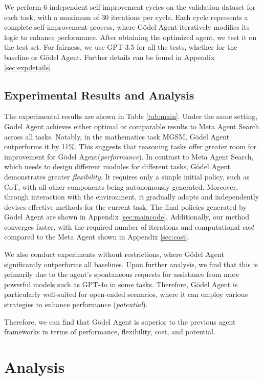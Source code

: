 \documentclass[11pt]{article}
\newcommand{\framework}{Gödel Agent\xspace}
\begin{document}
We perform 6 independent self-improvement cycles on the validation dataset for each task, with a maximum of 30 iterations per cycle. Each cycle represents a complete self-improvement process, where \framework iteratively modifies its logic to enhance performance.
After obtaining the optimized agent, we test it on the test set. For fairness, we use GPT-3.5 for all the tests, whether for the baseline or \framework{}.
Further details can be found in Appendix \ref{sec:expdetails}.



\subsection{Experimental Results and Analysis}
The experimental results are shown in Table \ref{tab:main}. Under the same setting, \framework achieves either optimal or comparable results to Meta Agent Search across all tasks. Notably, in the mathematics task MGSM, \framework outperforms it by 11\%. This suggests that reasoning tasks offer greater room for improvement for \framework (\textit{performance}). 
In contrast to Meta Agent Search, which needs to design different modules for different tasks, \framework demonstrates greater \textit{flexibility}. It requires only a simple initial policy, such as CoT, with all other components being autonomously generated. 
Moreover, through interaction with the environment, it gradually adapts and independently devises effective methods for the current task. The final policies generated by \framework are shown in Appendix \ref{sec:maincode}. Additionally, our method converges faster, with the required number of iterations and computational \textit{cost} compared to the Meta Agent shown in Appendix \ref{sec:cost}. 


We also conduct experiments without restrictions, where \framework significantly outperforms all baselines. Upon further analysis, we find that this is primarily due to the agent's spontaneous requests for assistance from more powerful models such as GPT-4o in some tasks. Therefore, \framework is particularly well-suited for open-ended scenarios, where it can employ various strategies to enhance performance (\textit{potential}).

Therefore, we can find that \framework{} is superior to the previous agent frameworks in terms of performance, flexibility, cost, and potential.


\section{Analysis}
\end{document}
